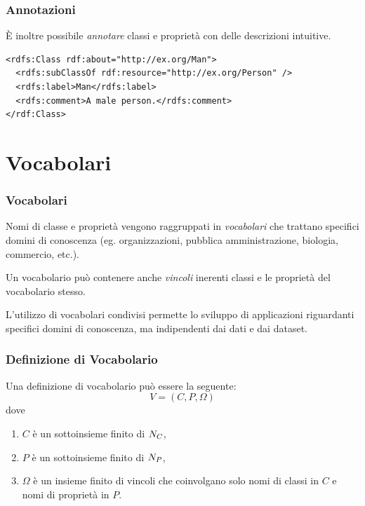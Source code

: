 \documentclass[8pt]{beamer}
\begin{document}
\begin{frame}[fragile]
 \frametitle{Annotazioni}
 \`E inoltre possibile \emph{annotare} classi e propriet\`a con 
 delle descrizioni intuitive.
 \vspace{\baselineskip}
 
\begin{Verbatim}[fontsize=\small]
<rdfs:Class rdf:about="http://ex.org/Man">
  <rdfs:subClassOf rdf:resource="http://ex.org/Person" />
  <rdfs:label>Man</rdfs:label>
  <rdfs:comment>A male person.</rdfs:comment>
</rdf:Class>
\end{Verbatim} 
\end{frame}

\section{Vocabolari}

\begin{frame}
\frametitle{Vocabolari}
	
	Nomi di classe e propriet\`a vengono raggruppati in \emph{vocabolari}
	che trattano specifici domini di conoscenza (eg. organizzazioni, 
	pubblica amministrazione, biologia, commercio, etc.). 
	\vspace{\baselineskip}
	
	Un vocabolario
	pu\`o contenere anche \emph{vincoli} inerenti classi e le propriet\`a 
	del vocabolario stesso.
	\vspace{\baselineskip}
	
	L'utilizzo di vocabolari condivisi permette lo sviluppo di applicazioni
	riguardanti specifici domini di conoscenza, ma indipendenti dai dati
	e dai dataset.
\end{frame}

\begin{frame}
\frametitle{Definizione di Vocabolario}
	Una definizione di vocabolario pu\`o essere la seguente:
	\[
	 V = (C, P, \Omega)
	\]
	dove
	\begin{enumerate}
	 \item $C$ \`e un sottoinsieme finito di $N_C$,
	 \item $P$ \`e un sottoinsieme finito di $N_P$,
	 \item $\Omega$ \`e un insieme finito di vincoli che coinvolgano solo
	 nomi di classi in $C$ e nomi di propriet\`a in $P$.
	\end{enumerate}
\end{frame}
\end{document}
